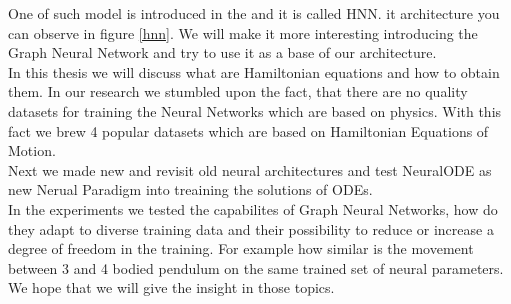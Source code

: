 One of such model is introduced in the \cite{} and it is called HNN. it architecture you can observe in figure \ref{hnn}.
We will make it more interesting introducing the Graph Neural Network and try to use it as a base of our architecture.\\
In this thesis we will discuss what are Hamiltonian equations and how to obtain them. In our research we stumbled upon the fact, that there are no quality datasets for training the Neural Networks which are based on physics. With this fact we brew 4 popular datasets which are based on Hamiltonian Equations of Motion.\\
Next we made new and revisit old neural architectures and test NeuralODE as new Nerual Paradigm into treaining the solutions of ODEs.\\
In the experiments we tested the capabilites of Graph Neural Networks, how do they adapt to diverse training data and their possibility to reduce or increase a degree of freedom in the training. For example how similar is the movement between 3 and 4 bodied pendulum on the same trained set of neural parameters. We hope that we will give the insight in those topics.    








